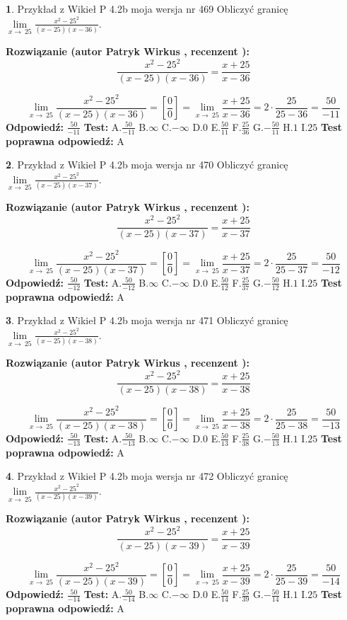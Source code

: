 \documentclass[12pt, a4paper]{article}
\theoremstyle{definition} %
\newtheorem{zad}{}
\newcommand{\zadStart}[1]{\begin{zad}#1\newline}
\newcommand{\zadStop}{\end{zad}}
\newcommand{\rozwStart}[2]{\noindent \textbf{Rozwiązanie (autor #1 , recenzent #2): }\newline}
\newcommand{\rozwStop}{\newline}
\newcommand{\odpStart}{\noindent \textbf{Odpowiedź:}\newline}
\newcommand{\odpStop}{\newline}
\newcommand{\testStart}{\noindent \textbf{Test:}\newline}
\newcommand{\testStop}{\newline}
\newcommand{\kluczStart}{\noindent \textbf{Test poprawna odpowiedź:}\newline}
\newcommand{\kluczStop}{\newline}
\begin{document}
\zadStart{Przykład z Wikieł P 4.2b moja wersja nr 469}
Obliczyć granicę $\lim\limits_{x\to\ 25}\frac{x^{2}-25^{2}}{(x-25)(x-36)}$.
\zadStop
\rozwStart{Patryk Wirkus}{}
$$\frac{x^{2}-25^{2}}{(x-25)(x-36)}=\frac{x+25}{x-36}$$

$$\lim\limits_{x\to\ 25}\frac{x^{2}-25^{2}}{(x-25)(x-36)}=[\frac{0}{0}]=\lim\limits_{x\to\ 25}\frac{x+25}{x-36}=2 \cdot \frac{25}{25-36} = \frac{50}{-11}$$
\rozwStop
\odpStart
$\frac{50}{-11}$
\odpStop
\testStart
A.$\frac{50}{-11}$
B.$\infty$
C.$-\infty$
D.$0$
E.$\frac{50}{11}$
F.$\frac{25}{36}$
G.$-\frac{50}{11}$
H.$1$
I.$25$
\testStop
\kluczStart
A
\kluczStop



\zadStart{Przykład z Wikieł P 4.2b moja wersja nr 470}
Obliczyć granicę $\lim\limits_{x\to\ 25}\frac{x^{2}-25^{2}}{(x-25)(x-37)}$.
\zadStop
\rozwStart{Patryk Wirkus}{}
$$\frac{x^{2}-25^{2}}{(x-25)(x-37)}=\frac{x+25}{x-37}$$

$$\lim\limits_{x\to\ 25}\frac{x^{2}-25^{2}}{(x-25)(x-37)}=[\frac{0}{0}]=\lim\limits_{x\to\ 25}\frac{x+25}{x-37}=2 \cdot \frac{25}{25-37} = \frac{50}{-12}$$
\rozwStop
\odpStart
$\frac{50}{-12}$
\odpStop
\testStart
A.$\frac{50}{-12}$
B.$\infty$
C.$-\infty$
D.$0$
E.$\frac{50}{12}$
F.$\frac{25}{37}$
G.$-\frac{50}{12}$
H.$1$
I.$25$
\testStop
\kluczStart
A
\kluczStop



\zadStart{Przykład z Wikieł P 4.2b moja wersja nr 471}
Obliczyć granicę $\lim\limits_{x\to\ 25}\frac{x^{2}-25^{2}}{(x-25)(x-38)}$.
\zadStop
\rozwStart{Patryk Wirkus}{}
$$\frac{x^{2}-25^{2}}{(x-25)(x-38)}=\frac{x+25}{x-38}$$

$$\lim\limits_{x\to\ 25}\frac{x^{2}-25^{2}}{(x-25)(x-38)}=[\frac{0}{0}]=\lim\limits_{x\to\ 25}\frac{x+25}{x-38}=2 \cdot \frac{25}{25-38} = \frac{50}{-13}$$
\rozwStop
\odpStart
$\frac{50}{-13}$
\odpStop
\testStart
A.$\frac{50}{-13}$
B.$\infty$
C.$-\infty$
D.$0$
E.$\frac{50}{13}$
F.$\frac{25}{38}$
G.$-\frac{50}{13}$
H.$1$
I.$25$
\testStop
\kluczStart
A
\kluczStop



\zadStart{Przykład z Wikieł P 4.2b moja wersja nr 472}
Obliczyć granicę $\lim\limits_{x\to\ 25}\frac{x^{2}-25^{2}}{(x-25)(x-39)}$.
\zadStop
\rozwStart{Patryk Wirkus}{}
$$\frac{x^{2}-25^{2}}{(x-25)(x-39)}=\frac{x+25}{x-39}$$

$$\lim\limits_{x\to\ 25}\frac{x^{2}-25^{2}}{(x-25)(x-39)}=[\frac{0}{0}]=\lim\limits_{x\to\ 25}\frac{x+25}{x-39}=2 \cdot \frac{25}{25-39} = \frac{50}{-14}$$
\rozwStop
\odpStart
$\frac{50}{-14}$
\odpStop
\testStart
A.$\frac{50}{-14}$
B.$\infty$
C.$-\infty$
D.$0$
E.$\frac{50}{14}$
F.$\frac{25}{39}$
G.$-\frac{50}{14}$
H.$1$
I.$25$
\testStop
\kluczStart
A
\kluczStop
\end{document}
